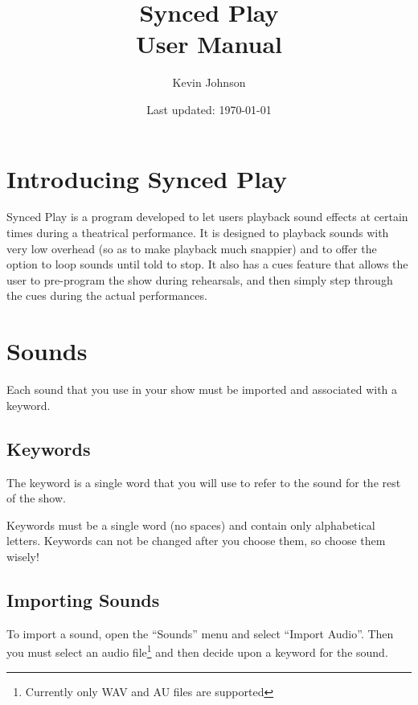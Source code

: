 \documentclass{article}
\begin{document}
\title{Synced Play \\ User Manual}
\author{Kevin Johnson}
\date{Last updated: \today}
\maketitle{}

\newpage

\tableofcontents

\newpage

\section{Introducing Synced Play}

Synced Play is a program developed to let users playback sound effects
at certain times during a theatrical performance. It is designed to
playback sounds with very low overhead (so as to make playback much snappier)
and to offer the option to loop sounds until told to stop. It also has a
cues feature that allows the user to pre-program the show during rehearsals,
and then simply step through the cues during the actual performances.

\newpage

\section{Sounds}

Each sound that you use in your show must be imported and associated with
a keyword.

\subsection{Keywords}

The keyword is a single word that you will use to refer to the sound for
the rest of the show.

Keywords must be a single word (no spaces) and contain only alphabetical
letters. Keywords can not be changed after you choose them, so choose
them wisely!

\subsection{Importing Sounds}

To import a sound, open the ``Sounds'' menu and select ``Import Audio''. Then
you must select an audio file\footnote{Currently only WAV and AU files
are supported} and then decide upon a keyword for the sound.
\end{document}
